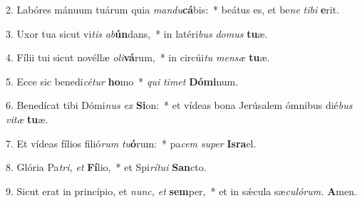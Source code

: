 \item 2. Labóres mánuum tuárum quia \textit{mandu}\textbf{cá}bis:~* beátus es, et be\textit{ne} \textit{tibi} \textbf{e}rit.
\item 3. Uxor tua sicut vi\textit{tis} \textit{ab}\textbf{ún}dans,~* in latéri\textit{bus} \textit{domus} \textbf{tu}æ.
\item 4. Fílii tui sicut novéllæ \textit{oli}\textbf{vá}rum,~* in circúi\hspace{0.03em}\textit{tu} \textit{mensæ} \textbf{tu}æ.
\item 5. Ecce sic benedi\hspace{0.03em}\textit{cétur} \textbf{ho}mo~* \textit{qui} \textit{timet} \textbf{Dómi}num.
\item 6. Benedícat tibi Dómi\textit{nus} \textit{ex} \textbf{Si}on:~* et vídeas bona Jerúsalem ómnibus dié\textit{bus} \textit{vitæ} \textbf{tu}æ.
\item 7. Et vídeas fílios filió\textit{rum} \textit{tu}\textbf{ó}rum:~* pa\hspace{0.03em}\textit{cem} \textit{super} \textbf{Isra}el.
\item 8. Glória Pa\hspace{0.03em}\textit{tri,} \textit{et} \textbf{Fí}lio,~* et Spi\textit{rítui} \textbf{San}cto.
\item 9. Sicut erat in princípio, et \textit{nunc,} \textit{et} \textbf{sem}per,~* et in sǽcula sæ\textit{culórum.} \textbf{A}men.
